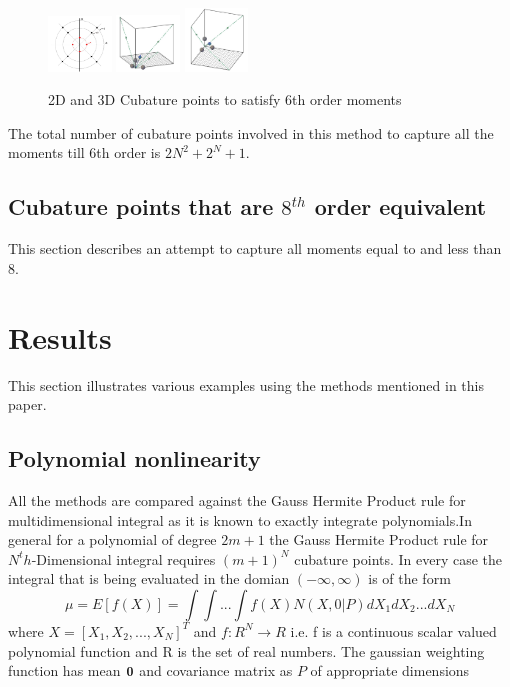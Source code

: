 \documentclass[letterpaper, 10 pt, conference]{ieeeconf}  %
\begin{document}
   \begin{figure}[thpb]
      \centering
      \includegraphics[width=0.15\textwidth]{6thmoment2d1}
      \includegraphics[width=0.15\textwidth]{3d6thmom}
      \includegraphics[width=0.15\textwidth]{3d6thmom2}
      \caption{2D and 3D Cubature points to satisfy 6th order moments}
      \label{fig:23d4m1}
   \end{figure}
The total number of cubature points involved in this method to capture all the moments till 6th order is $2N^2+2^N+1$. 

\subsection{Cubature points that are $8^{th}$ order equivalent}
This section describes an attempt to capture all moments equal to and less than 8. 

\section{Results}
This section illustrates various examples using the methods mentioned in this paper. 

\subsection{Polynomial nonlinearity}
All the methods are compared against the Gauss Hermite Product rule for multidimensional integral as it is known to exactly integrate polynomials.In general for a polynomial of degree $2m+1$ the Gauss Hermite Product rule for $N^th$-Dimensional integral requires $(m+1)^N$ cubature points. In every case the integral that is being evaluated in the domian $(-\infty,\infty)$ is of the form
\begin{equation}
\mu=E[f(X)]=\int{\int{...\int{f(X)N(X,0|P)}}}dX_1dX_2...dX_N
\end{equation}
where $X=[X_1,X_2,...,X_N]^T$ and $f:R^N \rightarrow R$ i.e. f is a continuous scalar valued polynomial function and R is the set of real numbers. The gaussian weighting function has mean ${\bf 0}$ and covariance matrix as $P$ of appropriate dimensions \newline
\end{document}
